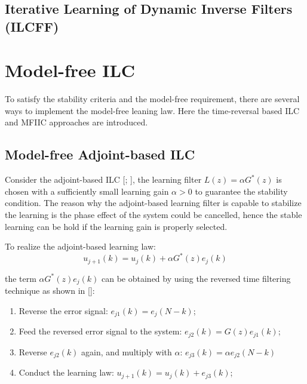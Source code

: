 \subsection{Iterative Learning of Dynamic Inverse Filters (ILCFF)}
\label{sec: Iterative Learning of Dynamic Inverse Filters (ILCFF)}

\section{Model-free ILC}
\label{sec: Model-free ILC}
To satisfy the stability criteria and the model-free requirement, there are several ways to implement the model-free leaning law. Here the time-reversal based ILC and MFIIC approaches are introduced.



\subsection{Model-free Adjoint-based ILC}
\label{sec: Model-free Adjoint-based ILC}

Consider the adjoint-based ILC [\cite{ye2005zero}; \cite{owens2009robust}], the learning filter $L(z)=\alpha G^{*}(z)$ is chosen with a sufficiently small learning gain $\alpha>0$ to guarantee the stability condition. The reason why the adjoint-based learning filter is capable to stabilize the learning is the phase effect of the system could be cancelled, hence the stable learning can be hold if the learning gain is properly selected.

To realize the adjoint-based learning law:
\begin{equation}
u_{j+1}(k)= u_{j}(k)+ \alpha G^{*}(z)e_{j} (k)
\label{eq:TimeRever}
\end{equation}

the term $\alpha G^{*}(z)e_{j} (k)$ can be obtained by using the reversed time filtering technique as shown in [\cite{ye2005zero}]:

\begin{enumerate}
  \item Reverse the error signal: $e_{j1}(k)=e_{j}(N-k)$;
  \item Feed the reversed error signal to the system: $e_{j2}(k)=G(z)e_{j1}(k)$;
  \item Reverse $e_{j2}(k)$ again, and multiply with $\alpha$:  $e_{j3}(k)= \alpha e_{j2}(N-k)$
  \item Conduct the learning law: $u_{j+1}(k)=u_{j}(k)+e_{j3}(k)$;
\end{enumerate}


